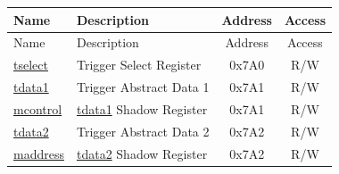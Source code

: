 \begin{longtable}{ | p{4.0cm} | p{8.4cm} | c | c| }
\hline\rowcolor{lightgray}
Name & Description & Address & Access \\ \hline
\endfirsthead
\hline
\rowcolor{lightgray}
Name & Description & Address & Access  \\
\hline
\endhead
\endfoot

\hyperref[regdesc:LPTSELECT]{tselect} & Trigger Select Register & 0x7A0 & R/W \\\hline
\hyperref[regdesc:LPTDATA1]{tdata1} & Trigger Abstract Data 1 & 0x7A1 & R/W \\\hline
\hyperref[regdesc:LPMCONTROL]{mcontrol} & \hyperref[regdesc:LPTDATA1]{tdata1} Shadow Register & 0x7A1 & R/W \\\hline
\hyperref[regdesc:LPTDATA2]{tdata2} & Trigger Abstract Data 2 & 0x7A2 & R/W \\\hline
\hyperref[regdesc:LPTDATA2]{maddress} & \hyperref[regdesc:LPTDATA2]{tdata2} Shadow Register & 0x7A2 & R/W \\\hline
\end{longtable}